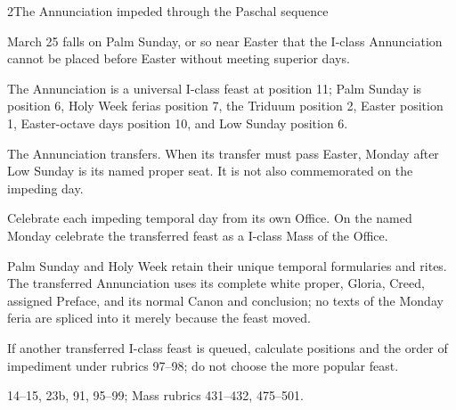 \begin{casefile}{2}{The Annunciation impeded through the Paschal sequence}
\item[Calendar facts] March 25 falls on Palm Sunday, or so near Easter that the I-class Annunciation cannot be placed before Easter without meeting superior days.
\item[Ranks and rows] The Annunciation is a universal I-class feast at position 11; Palm Sunday is position 6, Holy Week ferias position 7, the Triduum position 2, Easter position 1, Easter-octave days position 10, and Low Sunday position 6.
\item[Impeded item] The Annunciation transfers.  When its transfer must pass Easter, Monday after Low Sunday is its named proper seat.  It is not also commemorated on the impeding day.
\item[Mass category] Celebrate each impeding temporal day from its own Office.  On the named Monday celebrate the transferred feast as a I-class Mass of the Office.
\item[Assembly] Palm Sunday and Holy Week retain their unique temporal formularies and rites.  The transferred Annunciation uses its complete white proper, Gloria, Creed, assigned Preface, and its normal Canon and conclusion; no texts of the Monday feria are spliced into it merely because the feast moved.
\item[Boundary] If another transferred I-class feast is queued, calculate positions and the order of impediment under rubrics 97--98; do not choose the more popular feast.
\item[Rubric locus] 14--15, 23b, 91, 95--99; Mass rubrics 431--432, 475--501.
\end{casefile}

